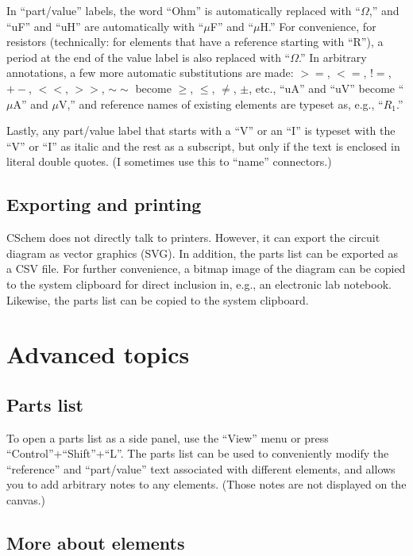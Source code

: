 \documentclass[11pt]{report}
\def\pls{+\discretionary{}{}{}}
\begin{document}
In ``part/value'' labels, the word ``Ohm'' is automatically replaced
with ``$\Omega$,'' and ``uF'' and ``uH'' are automatically with
``$\mu$F'' and ``$\mu$H.'' For convenience, for resistors
(technically: for elements that have a reference starting with ``R''),
a period at the end of the value label is also replaced with
``$\Omega$.'' In arbitrary annotations, a few more automatic
substitutions are made: $>=$, $<=$, $!=$, $+-$, $<<$, $>>$, $\sim\sim$
become $\ge$, $\le$, $\ne$, $\pm$, etc., ``uA'' and ``uV'' become
``$\mu$A'' and $\mu$V,'' and reference names of existing elements are
typeset as, e.g., ``$R_1$.''

Lastly, any part/value label that starts with a ``V'' or an ``I'' is
typeset with the ``V'' or ``I'' as italic and the rest as a subscript,
but only if the text is enclosed in literal double quotes. (I sometimes
use this to ``name'' connectors.)

\section{Exporting and printing}

CSchem does not directly talk to printers. However, it can export the
circuit diagram as vector graphics (SVG). In addition, the parts list
can be exported as a CSV file. For further convenience, a bitmap image
of the diagram can be copied to the system clipboard for direct
inclusion in, e.g., an electronic lab notebook. Likewise, the parts
list can be copied to the system clipboard.

\chapter{Advanced topics}

\section{Parts list}

To open a parts list as a side panel, use the ``View'' menu or press
``Control''\pls``Shift''\pls``L''. The parts list can be used to
conveniently modify the ``reference'' and ``part/value'' text
associated with different elements, and allows you to add arbitrary
notes to any elements. (Those notes are not displayed on the canvas.)

\section{More about elements}
\end{document}
